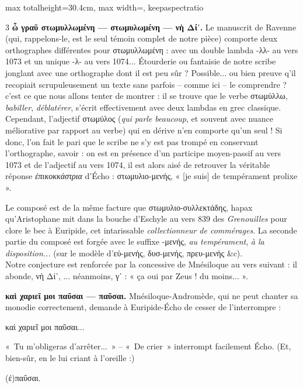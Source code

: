 \documentclass[11pt,twoside]{book}
\newcommand{\italique}[1]{\textit{#1}}
\newcommand{\citComm}[1]{\begin{quoting}[vskip=0.4pt,leftmargin=0.7em,rightmargin=0.2em]#1\end{quoting}}
\begin{document}
\begin{adjustbox}{max totalheight=30.4cm, max width=\textwidth, keepaspectratio}
\begin{minipage}{\textwidth}
{\begin{multicols}{3}
 \textbf{ὦ γραῦ στωμυλλωμένη — στωμυλωμένη — νὴ Δί᾽.} Le manuscrit de Ravenne (qui, rappelons-le, est le seul témoin complet de notre pièce) comporte deux orthographes différentes pour στωμυλλωμένη : avec un double lambda -λλ- au vers 1073 et un unique -λ- au vers 1074... Étourderie ou fantaisie de notre scribe jonglant avec une orthographe dont il est peu sûr ? Possible... ou bien preuve q'il recopiait scrupuleusement un texte sans parfois – comme ici – le comprendre ? c'est ce que nous allons tenter de montrer : il se trouve que le verbe στωμύλλω, \italique{babiller}, \italique{déblatérer}, s'écrit effectivement avec deux lambdas en grec classique. Cependant, l'adjectif στωμύλος (\italique{qui parle beaucoup}, et souvent avec nuance méliorative par rapport au verbe) qui en dérive n'en comporte qu'un seul ! Si donc, l'on fait le pari que le scribe ne s'y est pas trompé en conservant l'orthographe, savoir : on est en présence d'un participe moyen-passif au vers 1073 et de l'adjectif au vers 1074, il est alors aisé de retrouver la véritable réponse \italique{ἐπικοκκάστρια} d'Écho : στωμυλιο-μενής, « [je suis] de tempérament prolixe ».
\par\vspace{1.5pt}
\noindent Le composé est de la même facture que στωμυλιο-συλλεκτάδης, hapax qu'Aristophane mit dans la bouche d'Eschyle au vers 839 des \italique{Grenouilles} pour clore le bec à Euripide, cet intarissable \italique{collectionneur de commérages}. La seconde partie du composé est forgée avec le suffixe -μενής, \italique{au tempérament}, \italique{à la disposition...} (sur le modèle d'εὐ-μενής, δυσ-μενής, πρευ-μενής \&c).\\ Notre conjecture est renforcée par la concessive de Mnésiloque au vers suivant : il abonde, νὴ Δί᾽, ... néanmoins, γ᾽ : « ça oui par Zeus ! du moins... ».
\par\vspace{1.5pt}
 \textbf{καὶ χαριεῖ μοι παῦσαι --- παῦσαι.} Mnésiloque-Andromède, qui ne peut chanter sa monodie correctement, demande à Euripide-Écho de cesser de l'interrompre :
\citComm{καὶ χαριεῖ μοι παῦσαι...}
\par\vspace{1.5pt}
\noindent «~Tu m'obligeras d'arrêter...~» -- «~De crier~» interrompt facilement Écho. (Et, bien-sûr, en le lui criant à l'oreille :)
\citComm{ (ἐ)παΰσαι.}
\par\vspace{1.5pt}

\end{multicols}}
\end{minipage}
\end{adjustbox}
\end{document}
